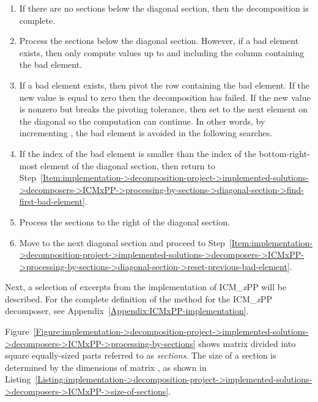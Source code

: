 \begin{enumerate}
\begin{enumerate}
		\end{enumerate}
	\item \label{Item:implementation->decomposition-project->implemented-solutions->decomposers->ICMxPP->processing-by-sections->no-lower-sections-check}
		If there are no sections below the diagonal section, then the decomposition is complete.
	\item \label{Item:implementation->decomposition-project->implemented-solutions->decomposers->ICMxPP->processing-by-sections->compute-lower-sections}
		Process the sections below the diagonal section. However, if a bad element exists, then only compute values up to and including the column containing the bad element.
	\item If a bad element exists, then pivot the row containing the bad element. If the new value is equal to zero then the decomposition has failed. If the new value is nonzero but breaks the pivoting tolerance, then set  to the next element on the diagonal so the computation can continue. In other words, by incrementing , the bad element is avoided in the following searches.
	\item \label{Item:implementation->decomposition-project->implemented-solutions->decomposers->ICMxPP->processing-by-sections->diagonal-lower-sections-while-condition}
		If the index of the bad element is smaller than the index of the bottom-right-most element of the diagonal section, then return to Step~\ref{Item:implementation->decomposition-project->implemented-solutions->decomposers->ICMxPP->processing-by-sections->diagonal-section->find-first-bad-element}.
	\item Process the sections to the right of the diagonal section.
	\item Move to the next diagonal section and proceed to Step~\ref{Item:implementation->decomposition-project->implemented-solutions->decomposers->ICMxPP->processing-by-sections->diagonal-section->reset-previous-bad-element}.
\end{enumerate}

Next, a selection of excerpts from the implementation of ICM\_\textit{x}PP will be described. For the complete definition of the  method for the ICM\_\textit{x}PP decomposer, see Appendix~\ref{Appendix:ICMxPP-implementation}.

Figure~\ref{Figure:implementation->decomposition-project->implemented-solutions->decomposers->ICMxPP->processing-by-sections} shows matrix  divided into square equally-sized parts referred to as \textit{sections}. The size of a section is determined by the dimensions of matrix , as shown in Listing~\ref{Listing:implementation->decomposition-project->implemented-solutions->decomposers->ICMxPP->size-of-sections}.

